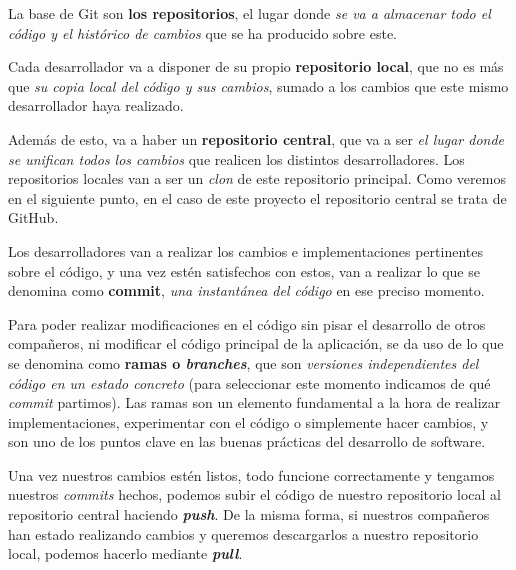 La base de Git son \textbf{los repositorios}, el lugar donde \textit{se va a almacenar todo el código y el histórico de cambios} que se ha producido sobre este. 

Cada desarrollador va a disponer de su propio \textbf{repositorio local}, que no es más que \textit{su copia local del código y sus cambios}, sumado a los cambios que este mismo desarrollador haya realizado. 


Además de esto, va a haber un \textbf{repositorio central}, que va a ser \textit{el lugar donde se unifican todos los cambios} que realicen los distintos desarrolladores. Los repositorios locales van a ser un \textit{clon} de este repositorio principal. Como veremos en el siguiente punto, en el caso de este proyecto el repositorio central se trata de GitHub.


Los desarrolladores van a realizar los cambios e implementaciones pertinentes sobre el código, y una vez estén satisfechos con estos, van a realizar lo que se denomina como \textbf{commit}, \textit{una instantánea del código} en ese preciso momento.


Para poder realizar modificaciones en el código sin pisar el desarrollo de otros compañeros, ni modificar el código principal de la aplicación, se da uso de lo que se denomina como \textbf{ramas o \textit{branches}}, que son \textit{versiones independientes del código en un estado concreto} (para seleccionar este momento indicamos de qué \textit{commit} partimos). Las ramas son un elemento fundamental a la hora de realizar implementaciones, experimentar con el código o simplemente hacer cambios, y son uno de los puntos clave en las buenas prácticas del desarrollo de software.

Una vez nuestros cambios estén listos, todo funcione correctamente y tengamos nuestros \textit{commits} hechos, podemos subir el código de nuestro repositorio local al repositorio central haciendo \textit{\textbf{push}}. De la misma forma, si nuestros compañeros han estado realizando cambios y queremos descargarlos a nuestro repositorio local, podemos hacerlo mediante \textit{\textbf{pull}}.

